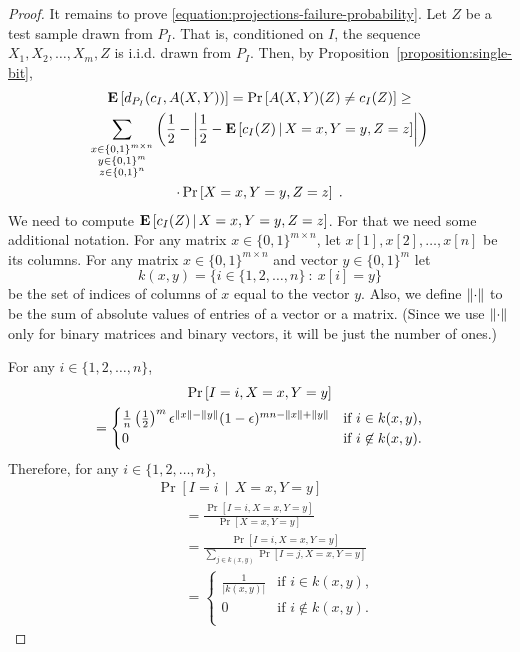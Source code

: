 \begin{proof}
It remains to prove \eqref{equation:projections-failure-probability}. Let $Z$ be
a test sample drawn from $P_I$. That is, conditioned on $I$, the sequence $X_1,
X_2, \dots, X_m, Z$ is i.i.d. drawn from $P_I$. Then, by
Proposition~\ref{proposition:single-bit},
\begin{multline}
\label{equation:projections-expected-error-lower-bound}
\operatorname{\mathbf{E}} \left[d_{P_I}(c_I, A(X,Y))\right]
= \Pr\left[ A(X,Y)(Z) \neq c_I(Z) \right] \ge \\
\sum_{\substack{x \in \{0,1\}^{m \times n} \\ y \in \{0,1\}^m \\ z \in \{0,1\}^n}} \left( \frac{1}{2} - \left| \frac{1}{2} - \operatorname{\mathbf{E}}\left[ c_I(Z) \, \middle| \, X = x, Y = y, Z = z \right] \right| \right)
\\ \cdot \Pr \left[X = x, Y = y, Z = z \right]  \; .
\end{multline}
We need to compute $\operatorname{\mathbf{E}}\left[ c_I(Z) \, \middle| \, X = x, Y = y, Z = z \right]$.
For that we need some additional notation.
For any matrix $x \in \{0,1\}^{m \times n}$, let $x[1], x[2], \dots, x[n]$ be its columns.
For any matrix $x \in \{0,1\}^{m \times n}$ and vector $y \in \{0,1\}^m$ let
$$
k(x,y) = \{ i \in \{1,2,\dots,n\} ~:~ x[i] = y \}
$$
be the set of indices of columns of $x$ equal to the vector $y$. Also, we define
$\left\| \cdot \right\|$ to be the sum of absolute values of entries of a vector or a
matrix. (Since we use $\left\| \cdot \right\|$ only for binary matrices and binary
vectors, it will be just the number of ones.)

For any $i \in \{1,2,\dots,n\}$,
\begin{multline*}
\Pr \left[I = i, X = x, Y = y \right] \\
=
\begin{cases}
\frac{1}{n} \left( \frac{1}{2} \right)^m \epsilon^{\left\| x \right\| - \left\| y \right\|} (1 - \epsilon)^{mn - \left\| x \right\| + \left\| y \right\|} & \text{if $i \in k(x,y)$,} \\
0 & \text{if $i \not \in k(x,y)$.} \\
\end{cases}
\end{multline*}
Therefore, for any $i \in \{1,2,\dots,n\}$,
\begin{align*}
& \Pr \left[I = i \, \middle| \, X = x, Y = y \right] \\
& \qquad = \frac{\Pr \left[I = i, X = x, Y = y \right]}{\Pr \left[ X = x, Y = y \right]} \\
& \qquad = \frac{\Pr \left[I = i, X = x, Y = y \right]}{\sum_{j \in k(x,y)} \Pr \left[ I = j, X = x, Y = y \right]} \\
& \qquad =
\begin{cases}
\frac{1}{|k(x,y)|} & \text{if $i \in k(x,y)$,} \\
0 & \text{if $i \not \in k(x,y)$.} \\
\end{cases}
\end{align*}


\end{proof}
